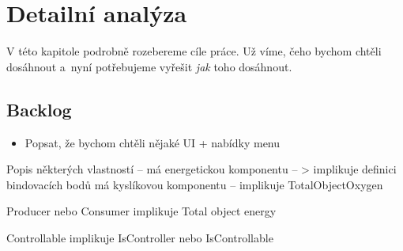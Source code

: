 
\chapter{Detailní analýza}

V této kapitole podrobně rozebereme cíle práce. Už víme, čeho bychom chtěli dosáhnout a~nyní potřebujeme vyřešit \textit{jak} toho dosáhnout.



















\section{Backlog}

\begin{itemize}
	
	\item Popsat, že bychom chtěli nějaké UI + nabídky menu

\end{itemize}



Popis některých vlastností -- má energetickou komponentu -- > implikuje definici bindovacích bodů
má kyslíkovou komponentu -- implikuje TotalObjectOxygen

Producer nebo Consumer implikuje Total object energy

Controllable implikuje IsController nebo IsControllable
